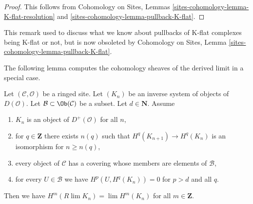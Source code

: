 \begin{proof}
This follows from Cohomology on Sites, Lemmas
\ref{sites-cohomology-lemma-K-flat-resolution} and
\ref{sites-cohomology-lemma-pullback-K-flat}.
\end{proof}

\begin{remark}
\label{remark-pullback-K-flat}
This remark used to discuss what we know about pullbacks of K-flat complexes
being K-flat or not, but is now obsoleted by
Cohomology on Sites, Lemma \ref{sites-cohomology-lemma-pullback-K-flat}.
\end{remark}

\noindent
The following lemma computes the cohomology sheaves of the
derived limit in a special case.

\begin{lemma}
\label{lemma-Rlim-of-system}
Let $(\mathcal{C}, \mathcal{O})$ be a ringed site. Let $(K_n)$
be an inverse system of objects of $D(\mathcal{O})$.
Let $\mathcal{B} \subset \Ob(\mathcal{C})$ be a subset.
Let $d \in \mathbf{N}$. Assume
\begin{enumerate}
\item $K_n$ is an object of $D^+(\mathcal{O})$ for all $n$,
\item for $q \in \mathbf{Z}$ there exists
$n(q)$ such that $H^q(K_{n + 1}) \to H^q(K_n)$ is an isomorphism for
$n \geq n(q)$,
\item every object of $\mathcal{C}$ has a covering whose members are
elements of $\mathcal{B}$,
\item for every $U \in \mathcal{B}$ we have $H^p(U, H^q(K_n)) = 0$
for $p > d$ and all $q$.
\end{enumerate}
Then we have $H^m(R\lim K_n) = \lim H^m(K_n)$ for all $m \in \mathbf{Z}$.
\end{lemma}

